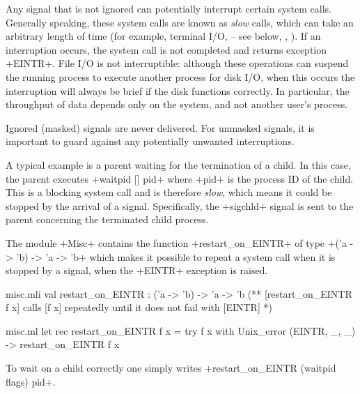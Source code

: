 Any signal that is not ignored can potentially interrupt 
certain system calls.  Generally speaking, these system calls are 
known as \emph{slow} calls, which can take an arbitrary length of time (for
example, terminal I/O,  -- see below, , \etc).
If an interruption occurs, the system call is not completed and
returns exception \ml+EINTR+.  File I/O is not interruptible:
although these operations can suspend the running process to 
execute another process for disk I/O, when this occurs the interruption
will always be brief if the disk functions correctly.  In particular, 
the throughput of data depends only on the system, and not another user's
process.

Ignored (masked) signals are never delivered.  For unmasked 
signals, it is important to guard against any potentially 
unwanted interruptions.

A typical example is a parent waiting for the termination of a child.
In this case, the parent executes \ml+waitpid [] pid+ where \ml+pid+ 
is the process ID of the child.  This is a blocking system call and 
is therefore \emph{slow}, which means it could be stopped by the 
arrival of a signal.  Specifically, the \ml+sigchld+ signal is sent 
to the parent concerning the terminated child process.

The module \ml+Misc+ contains the function
\ml+restart_on_EINTR+ of type \ml+('a -> 'b) -> 'a -> 'b+ which
makes it possible to repeat a system call when it is stopped
by a signal, \ie{} when the \ml+EINTR+ exception is raised.

%
\begin{codefile}{misc.mli}
val restart_on_EINTR : ('a -> 'b) -> 'a -> 'b
(** [restart_on_EINTR f x] calls [f x] repeatedly until it does not fail
with [EINTR] *)
\end{codefile}
%
\begin{listingcodefile}{misc.ml}
let rec restart_on_EINTR f x = 
  try f x with Unix_error (EINTR, _, _) -> restart_on_EINTR f x
\end{listingcodefile}
\label{restart_on_EINTR}%
To wait on a child correctly one simply writes
\ml+restart_on_EINTR (waitpid flags) pid+.

